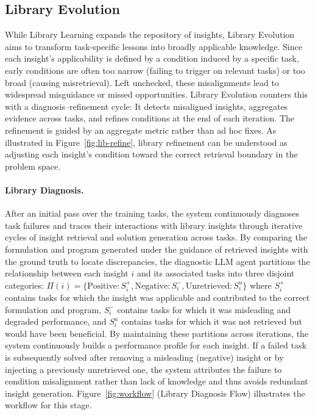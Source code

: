 \documentclass[sigconf, nonacm]{acmart}
\begin{document}
\subsection{Library Evolution
\label{sec:method:library_evolution}} 

While Library Learning expands the repository of insights, Library Evolution aims to transform task-specific lessons into broadly applicable knowledge. Since each insight’s applicability is defined by a condition induced by a specific task, early conditions are often too narrow (failing to trigger on relevant tasks) or too broad (causing misretrieval). Left unchecked, these misalignments lead to widespread misguidance or missed opportunities. Library Evolution counters this with a diagnosis–refinement cycle: It detects misaligned insights, aggregates evidence across tasks, and refines conditions at the end of each iteration. The refinement is guided by an aggregate metric rather than ad hoc fixes. As illustrated in Figure~\ref{fig:lib-refine}, library refinement can be understood as adjusting each insight’s condition toward the correct retrieval boundary in the problem space. 


\paragraph{\textbf{Library Diagnosis.}}
 After an initial pass over the training tasks, the system continuously diagnoses task failures and traces their interactions with library insights through iterative cycles of insight retrieval and solution generation across tasks. By comparing the formulation and program generated under the guidance of retrieved insights with the ground truth to locate discrepancies, the diagnostic LLM agent partitions the relationship between each insight $i$ and its associated tasks into three disjoint categories:
$\Pi(i)=\{\text{Positive}:S_i^+, \text{Negative}:S_i^-, \text{Unretrieved}:S_i^u\}$
where $S_i^{+}$ contains tasks for which the insight was applicable and contributed to the correct formulation and program, $S_i^{-}$ contains tasks for which it was misleading and degraded performance, and $S_i^{u}$ contains tasks for which it was not retrieved but would have been beneficial. By maintaining these partitions across iterations, the system continuously builds a performance profile for each insight. If a failed task is subsequently solved after removing a misleading (negative) insight or by injecting a previously unretrieved one, the system attributes the failure to condition misalignment rather than lack of knowledge and thus avoids redundant insight generation. Figure~\ref{fig:workflow} (Library Diagnosis Flow) illustrates the workflow for this stage.
\end{document}
